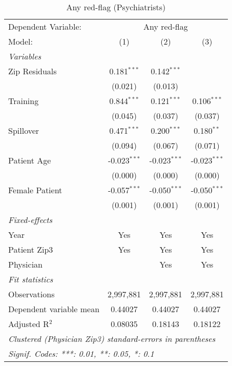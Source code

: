 
\begin{table}[htbp]
   \centering
   \begin{threeparttable}[b]
      \caption{Any red-flag (Psychiatrists)}
      \begin{tabular}{lccc}
         \tabularnewline \midrule \midrule
         Dependent Variable: & \multicolumn{3}{c}{Any red-flag}\\
         Model:                  & (1)            & (2)            & (3)\\  
         \midrule
         \emph{Variables}\\
         Zip Residuals           & 0.181$^{***}$  & 0.142$^{***}$  &   \\   
                                 & (0.021)        & (0.013)        &   \\   
         Training                & 0.844$^{***}$  & 0.121$^{***}$  & 0.106$^{***}$\\   
                                 & (0.045)        & (0.037)        & (0.037)\\   
         Spillover               & 0.471$^{***}$  & 0.200$^{***}$  & 0.180$^{**}$\\   
                                 & (0.094)        & (0.067)        & (0.071)\\   
         Patient Age             & -0.023$^{***}$ & -0.023$^{***}$ & -0.023$^{***}$\\   
                                 & (0.000)        & (0.000)        & (0.000)\\   
         Female Patient          & -0.057$^{***}$ & -0.050$^{***}$ & -0.050$^{***}$\\   
                                 & (0.001)        & (0.001)        & (0.001)\\   
         \midrule
         \emph{Fixed-effects}\\
         Year                    & Yes            & Yes            & Yes\\  
         Patient Zip3            & Yes            & Yes            & Yes\\  
         Physician               &                & Yes            & Yes\\  
         \midrule
         \emph{Fit statistics}\\
         Observations            & 2,997,881      & 2,997,881      & 2,997,881\\  
         Dependent variable mean & 0.44027        & 0.44027        & 0.44027\\  
         Adjusted R$^2$          & 0.08035        & 0.18143        & 0.18122\\  
         \midrule \midrule
         \multicolumn{4}{l}{\emph{Clustered (Physician Zip3) standard-errors in parentheses}}\\
         \multicolumn{4}{l}{\emph{Signif. Codes: ***: 0.01, **: 0.05, *: 0.1}}\\
      \end{tabular}
   \end{threeparttable}
\end{table}



